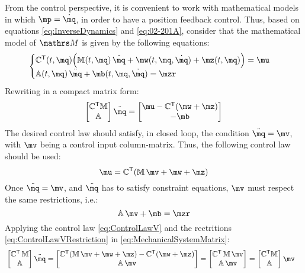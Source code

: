 From the control perspective, it is convenient to work with mathematical models in which $\mp = \dot \mq$, 
in order to have a position feedback control.
Thus, based on equations \eqref{eq:InverseDynamics} and \eqref{eq:02-201A}, consider that 
the mathematical model of $\ssM$ is given by the following equations:
\begin{equation} \label{eq:MechanicalSystem}
\begin{cases}
\mC^\msT (t, \mq) \Big( \mM (t, \mq) \, \ddot{\mq} + \mw (t, \mq, \dot{\mq}) + \mz (t, \mq) \Big) = \mu \\
\mA (t, \mq) \, \ddot{\mq} + \mb (t, \mq, \dot{\mq}) = \mzr
\end{cases}
\end{equation}
Rewriting in a compact matrix form:
\begin{equation} \label{eq:MechanicalSystemMatrix}
\begin{bmatrix}
\mC^\msT \mM \\
\mA
\end{bmatrix}
\ddot{\mq}
=
\begin{bmatrix}
\mu - \mC^\msT(\mw + \mz) \\
-\mb
\end{bmatrix}
\end{equation}
The desired control law should satisfy, in closed loop, the condition $ \ddot{\mq} = \mv $, with $\mv$ being 
a control input column-matrix. 
Thus, the following control law should be used:
\begin{equation} \label{eq:ControlLawV}
\mu = \mC^\msT ( \mM \, \mv + \mw + \mz )
\end{equation}
Once $ \ddot{\mq} = \mv $, and $\ddot{\mq}$ has to satisfy constraint equations, $\mv$ must respect the same restrictions, i.e.:
\begin{equation} \label{eq:ControlLawVRestriction}
\mA \, \mv + \mb = \mzr
\end{equation}
Applying the control law \eqref{eq:ControlLawV} and the 
rectritions \eqref{eq:ControlLawVRestriction} in \eqref{eq:MechanicalSystemMatrix}: 
\begin{align*}
&	\begin{bmatrix}
	\mC^\msT \, \mM \\
	\mA
	\end{bmatrix}
	\ddot{\mq}
	=
	\begin{bmatrix}
	\mC^\msT ( \mM \, \mv + \mw + \mz ) - \mC^\msT(\mw + \mz) \\
	\mA \, \mv
	\end{bmatrix}
	=
	\begin{bmatrix}
	\mC^\msT  \, \mM \, \mv \\
	\mA \, \mv
	\end{bmatrix}
	=
	\begin{bmatrix}
	\mC^\msT \mM \\
	\mA
	\end{bmatrix}
	\mv 
\end{align*}
